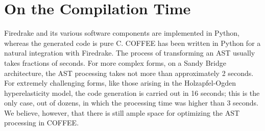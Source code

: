 \section{On the Compilation Time}
Firedrake and its various software components are implemented in Python, whereas the generated code is pure C. COFFEE has been written in Python for a natural integration with Firedrake. The process of transforming an AST usually takes fractions of seconds. For more complex forms, on a Sandy Bridge architecture, the AST processing takes not more than approximately 2 seconds. For extremely challenging forms, like those arising in the Holzapfel-Ogden hyperelasticity model, the code generation is carried out in 16 seconds; this is the only case, out of dozens, in which the processing time was higher than 3 seconds. We believe, however, that there is still ample space for optimizing the AST processing in COFFEE.
